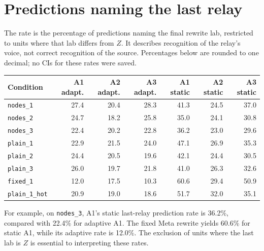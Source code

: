 \documentclass[11pt]{article}
\newcommand{\cond}[1]{\texttt{#1}}
\begin{document}
\section{Predictions naming the last relay}
The rate is the percentage of predictions naming the final rewrite lab,
restricted to units where that lab differs from $Z$. It describes recognition
of the relay's voice, not correct recognition of the source. Percentages below
are rounded to one decimal; no CIs for these rates were saved.
\begin{center}
\small
\begin{tabular}{lrrrrrr}
\toprule
Condition & A1 adapt. & A2 adapt. & A3 adapt. & A1 static & A2 static & A3 static \\
\midrule
\texttt{nodes\_1} & 27.4 & 20.4 & 28.3 & 41.3 & 24.5 & 37.0 \\
\texttt{nodes\_2} & 24.7 & 18.2 & 25.8 & 35.0 & 24.1 & 30.8 \\
\texttt{nodes\_3} & 22.4 & 20.2 & 22.8 & 36.2 & 23.0 & 29.6 \\
\texttt{plain\_1} & 22.9 & 21.5 & 24.0 & 47.1 & 26.9 & 35.3 \\
\texttt{plain\_2} & 24.4 & 20.5 & 19.6 & 42.1 & 24.4 & 30.5 \\
\texttt{plain\_3} & 26.0 & 19.7 & 21.8 & 41.0 & 26.3 & 32.6 \\
\texttt{fixed\_1} & 12.0 & 17.5 & 10.3 & 60.6 & 29.4 & 50.9 \\
\texttt{plain\_1\_hot} & 20.9 & 19.0 & 18.6 & 51.7 & 32.0 & 35.1 \\
\bottomrule
\end{tabular}
\end{center}

For example, on \cond{nodes\_3}, A1's static last-relay prediction rate is
36.2\%, compared with 22.4\% for adaptive A1. The fixed Meta rewrite yields
60.6\% for static A1, while its adaptive rate is 12.0\%. The exclusion of
units where the last lab is $Z$ is essential to interpreting these rates.

\clearpage
\end{document}

